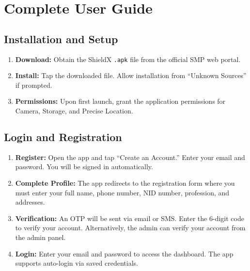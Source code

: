 \documentclass[11pt, a4paper]{report}
\begin{document}
\chapter{Complete User Guide}

\section*{Installation and Setup}
\begin{enumerate}
    \item \textbf{Download:} Obtain the ShieldX \texttt{.apk} file from the official SMP web portal.
    \item \textbf{Install:} Tap the downloaded file. Allow installation from ``Unknown Sources'' if prompted.
    \item \textbf{Permissions:} Upon first launch, grant the application permissions for Camera, Storage, and Precise Location.
\end{enumerate}

\section*{Login and Registration}
\begin{enumerate}
    \item \textbf{Register:} Open the app and tap ``Create an Account.'' Enter your email and password. You will be signed in automatically.
    \item \textbf{Complete Profile:} The app redirects to the registration form where you must enter your full name, phone number, NID number, profession, and addresses.
    \item \textbf{Verification:} An OTP will be sent via email or SMS. Enter the 6-digit code to verify your account. Alternatively, the admin can verify your account from the admin panel.
    \item \textbf{Login:} Enter your email and password to access the dashboard. The app supports auto-login via saved credentials.
\end{enumerate}
\end{document}
